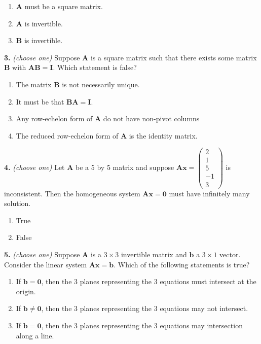 \documentclass[10pt,a4paper]{article}
\begin{document}
\begin{enumerate}[label=(\Alph*)]
\item \(\mathbf{A}\) must be a square matrix.
\item \(\mathbf{A}\) is invertible.
\item \(\mathbf{B}\) is invertible.
\end{enumerate}
\smallskip
\textbf{3.} \textit{(choose one)} Suppose \(\mathbf{A}\) is a square matrix such that there exists some matrix \(\mathbf{B}\) with \(\mathbf{AB=I}\). Which statement is false?

\begin{enumerate}[label=(\Alph*)]
\item The matrix \(\mathbf{B}\) is not necessarily unique.
\item It must be that \(\mathbf{BA=I}\).
\item Any row-echelon form of \(\mathbf{A}\) do not have non-pivot columns
\item The reduced row-echelon form of \(\mathbf{A}\) is the identity matrix.
\end{enumerate}
\smallskip
\textbf{4.} \textit{(choose one)} Let \(\mathbf{A}\) be a 5 by 5 matrix and suppose \(\mathbf{Ax}=\begin{pmatrix}2\\1\\5\\-1\\3\end{pmatrix}\) is inconsistent. Then the homogeneous system \(\mathbf{Ax=0}\) must have infinitely many solution.

\begin{enumerate}[label=(\Alph*)]
\item True
\item False
\end{enumerate}
\smallskip
\textbf{5.} \textit{(choose one)} Suppose \(\mathbf{A}\) is a \(3\times 3\) invertible matrix and \(\mathbf{b}\) a \(3\times 1\) vector. Consider the linear system \(\mathbf{Ax=b}\). Which of the following statements is true?

\begin{enumerate}[label=(\Alph*)]
\item If \(\mathbf{b=0}\), then the 3 planes representing the 3 equations must intersect at the origin.
\item If \(\mathbf{b\neq 0}\), then the 3 planes representing the 3 equations may not intersect.
\item If \(\mathbf{b=0}\), then the 3 planes representing the 3 equations may intersection along a line.
\end{enumerate}
\smallskip
\end{document}
